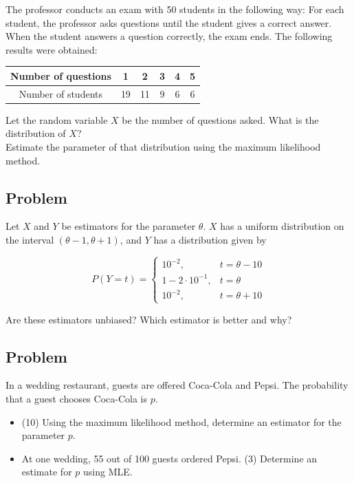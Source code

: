 \documentclass[a4paper, 12pt]{article}
\begin{document}
The professor conducts an exam with 50 students in the following way: For each student, the professor asks questions until the student gives a correct answer. When the student answers a question correctly, the exam ends.
The following results were obtained:

\begin{table}[h!]
\centering
\begin{tabular}{|c|c|c|c|c|c|}
\hline
Number of questions & 1  & 2  & 3 & 4 & 5 \\ \hline
Number of students  & 19 & 11 & 9 & 6 & 6 \\ \hline
\end{tabular}
\end{table}

Let the random variable $X$ be the number of questions asked. What is the distribution of  $X$?\\

Estimate the parameter of that distribution using the maximum likelihood method.


\subsection{Problem}
Let $X$ and $Y$ be estimators for the parameter $\theta$.
$X$ has a uniform distribution on the interval $(\theta - 1, \theta + 1)$, and $Y$ has a distribution given by 

\[
P (Y = t) =
\begin{cases}
  10^{-2}, & t = \theta-10 \\
  1-2\cdot 10^{-1}, & t = \theta \\
  10^{-2} , & t = \theta + 10
\end{cases}
\]

Are these estimators unbiased? Which estimator is better and why?

\subsection{Problem}
In a wedding restaurant, guests are offered Coca-Cola and Pepsi. The probability that a guest chooses Coca-Cola is $p$.

\begin{itemize}
  \item [a)] (10) Using the maximum likelihood method, determine an estimator for the parameter $p$.

\item [b)] At one wedding, 55 out of 100 guests ordered Pepsi. (3) Determine an estimate for $p$ using MLE.
\end{itemize}
\end{document}
